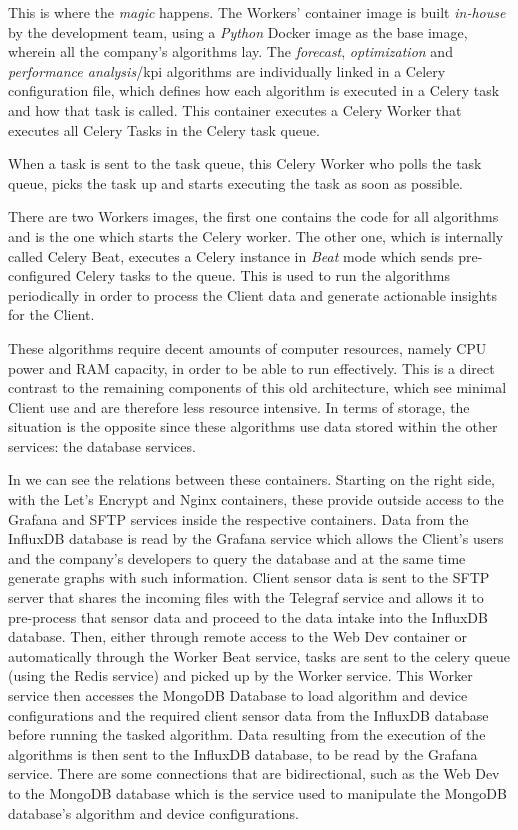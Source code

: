 This is where the \textit{magic} happens. The Workers' container image is built \textit{in-house} by the development team, using a \textit{Python} Docker image as the base image, wherein all the company's algorithms lay. The \textit{forecast}, \textit{optimization} and \textit{performance analysis}/\gls{kpi} algorithms are individually linked in a Celery configuration file, which defines how each algorithm is executed in a Celery task and how that task is called. This container executes a Celery Worker that executes all Celery Tasks in the Celery task queue.

When a task is sent to the task queue, this Celery Worker who polls the task queue, picks the task up and starts executing the task as soon as possible.

There are two Workers images, the first one contains the code for all algorithms and is the one which starts the Celery worker. The other one, which is internally called Celery Beat, executes a Celery instance in \textit{Beat} mode which sends pre-configured Celery tasks to the queue. This is used to run the algorithms periodically in order to process the Client data and generate actionable insights for the Client.

These algorithms require decent amounts of computer resources, namely CPU power and RAM capacity, in order to be able to run effectively. This is a direct contrast to the remaining components of this old architecture, which see minimal Client use and are therefore less resource intensive. In terms of storage, the situation is the opposite since these algorithms use data stored within the other services: the database services.



In  we can see the relations between these containers. Starting on the right side, with the  Let's Encrypt and Nginx containers, these provide outside access to the Grafana and SFTP services inside the respective containers. Data from the InfluxDB database is read by the Grafana service which allows the Client's users and the company's developers to query the database and at the same time generate graphs with such information. Client sensor data is sent to the SFTP server that shares the incoming files with the Telegraf service and allows it to pre-process that sensor data and proceed to the data intake into the InfluxDB database. Then, either through remote access to the Web Dev container or automatically through the Worker Beat service, tasks are sent to the celery queue (using the Redis service) and picked up by the Worker service. This Worker service then accesses the MongoDB Database to load algorithm and device configurations and the required client sensor data from the InfluxDB database before running the tasked algorithm. Data resulting from the execution of the algorithms is then sent to the InfluxDB database, to be read by the Grafana service. There are some connections that are bidirectional, such as the Web Dev to the MongoDB database which is the service used to manipulate the MongoDB database's algorithm and device configurations.

